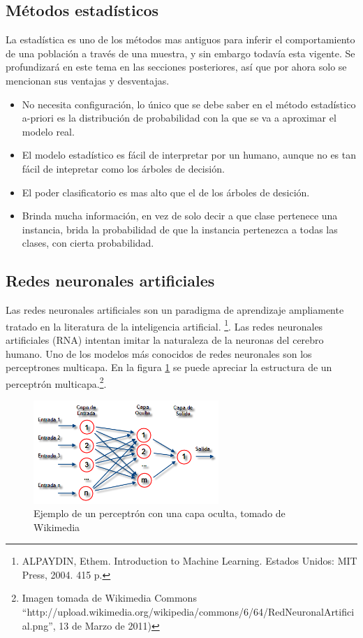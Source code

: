 \documentclass[a4paper, 11pt, oneside]{report}
\begin{document}
\subsection{Métodos estadísticos}

La estadística es uno de los métodos mas antiguos para inferir el comportamiento de una población a través de una muestra, y sin embargo todavía esta vigente. Se profundizará en este tema en las secciones posteriores, así que por ahora solo se mencionan sus ventajas y desventajas.

\begin{itemize}
	\item No necesita configuración, lo único que se debe saber en el método estadístico a-priori es la distribución de probabilidad con la que se va a  aproximar el modelo real.
	\item El modelo estadístico es fácil de interpretar por un humano, aunque no es tan fácil de intepretar como los árboles de decisión.
	\item El poder clasificatorio es mas alto que el de los árboles de desición.
	\item Brinda mucha información, en vez de solo decir a que clase pertenece una instancia, brida la probabilidad de que la instancia pertenezca a todas las clases, con cierta probabilidad.
\end{itemize}
	
\subsection{Redes neuronales artificiales}

Las redes neuronales artificiales son un paradigma de aprendizaje ampliamente tratado en la literatura de la inteligencia artificial. \footnote{ALPAYDIN, Ethem. Introduction to Machine Learning. Estados Unidos: MIT Press, 2004. 415 p.}. Las redes neuronales artificiales (RNA) intentan imitar la naturaleza de la neuronas del cerebro humano. Uno de los modelos más conocidos de redes neuronales son los perceptrones multicapa. En la figura \ref{fig:rna} se puede apreciar la estructura de un perceptrón multicapa.\footnote{Imagen tomada de Wikimedia Commons ``http://upload.wikimedia.org/wikipedia/commons/6/64/RedNeuronalArtificial.png'', 13 de Marzo de 2011)}.

\begin{figure}[htb]
\begin{center}
\leavevmode
\includegraphics[width=7cm]{img/rna.png}
\end{center}
\caption{Ejemplo de un perceptrón con una capa oculta, tomado de Wikimedia}
\label{fig:rna}
\end{figure}
\end{document}
